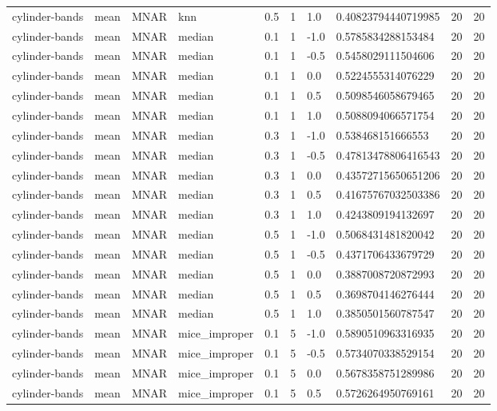 \begin{tabular}{llllllllll}
cylinder-bands & mean & MNAR & knn & 0.5 & 1 & 1.0 & 0.40823794440719985 & 20 & 20 \\
cylinder-bands & mean & MNAR & median & 0.1 & 1 & -1.0 & 0.5785834288153484 & 20 & 20 \\
cylinder-bands & mean & MNAR & median & 0.1 & 1 & -0.5 & 0.5458029111504606 & 20 & 20 \\
cylinder-bands & mean & MNAR & median & 0.1 & 1 & 0.0 & 0.5224555314076229 & 20 & 20 \\
cylinder-bands & mean & MNAR & median & 0.1 & 1 & 0.5 & 0.5098546058679465 & 20 & 20 \\
cylinder-bands & mean & MNAR & median & 0.1 & 1 & 1.0 & 0.5088094066571754 & 20 & 20 \\
cylinder-bands & mean & MNAR & median & 0.3 & 1 & -1.0 & 0.538468151666553 & 20 & 20 \\
cylinder-bands & mean & MNAR & median & 0.3 & 1 & -0.5 & 0.47813478806416543 & 20 & 20 \\
cylinder-bands & mean & MNAR & median & 0.3 & 1 & 0.0 & 0.43572715650651206 & 20 & 20 \\
cylinder-bands & mean & MNAR & median & 0.3 & 1 & 0.5 & 0.41675767032503386 & 20 & 20 \\
cylinder-bands & mean & MNAR & median & 0.3 & 1 & 1.0 & 0.4243809194132697 & 20 & 20 \\
cylinder-bands & mean & MNAR & median & 0.5 & 1 & -1.0 & 0.5068431481820042 & 20 & 20 \\
cylinder-bands & mean & MNAR & median & 0.5 & 1 & -0.5 & 0.4371706433679729 & 20 & 20 \\
cylinder-bands & mean & MNAR & median & 0.5 & 1 & 0.0 & 0.3887008720872993 & 20 & 20 \\
cylinder-bands & mean & MNAR & median & 0.5 & 1 & 0.5 & 0.3698704146276444 & 20 & 20 \\
cylinder-bands & mean & MNAR & median & 0.5 & 1 & 1.0 & 0.3850501560787547 & 20 & 20 \\
cylinder-bands & mean & MNAR & mice\_improper & 0.1 & 5 & -1.0 & 0.5890510963316935 & 20 & 20 \\
cylinder-bands & mean & MNAR & mice\_improper & 0.1 & 5 & -0.5 & 0.5734070338529154 & 20 & 20 \\
cylinder-bands & mean & MNAR & mice\_improper & 0.1 & 5 & 0.0 & 0.5678358751289986 & 20 & 20 \\
cylinder-bands & mean & MNAR & mice\_improper & 0.1 & 5 & 0.5 & 0.5726264950769161 & 20 & 20 \\

\end{tabular}
